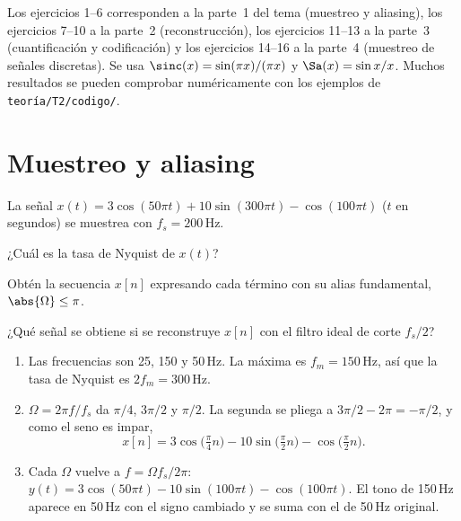 \documentclass[11pt,a4paper]{scrartcl}
\begin{document}
\ifsoluciones{}\else{}\fi

Los ejercicios 1–6 corresponden a la parte~1 del tema (muestreo y aliasing), los ejercicios 7–10 a la parte~2 (reconstrucción), los ejercicios 11–13 a la parte~3 (cuantificación y codificación) y los ejercicios 14–16 a la parte~4 (muestreo de señales discretas). Se usa $\sinc(x)=\sin(\pi x)/(\pi x)$ y $\Sa(x)=\sin x/x$. Muchos resultados se pueden comprobar numéricamente con los ejemplos de \texttt{teoría/T2/codigo/}.

\section*{Muestreo y aliasing}

\begin{ejercicio}
  La señal $x(t)=3\cos(50\pi t)+10\sin(300\pi t)-\cos(100\pi t)$ ($t$ en segundos) se muestrea con $f_s=200$\,Hz.
  \begin{incisos}[1]
    \item ¿Cuál es la tasa de Nyquist de $x(t)$?
    \item Obtén la secuencia $x[n]$ expresando cada término con su alias fundamental, $\abs{\Omega}\le\pi$.
    \item ¿Qué señal se obtiene si se reconstruye $x[n]$ con el filtro ideal de corte $f_s/2$?
  \end{incisos}
\end{ejercicio}
\begin{solucion}
  \begin{enumerate}[label=\alph*)]
    \item Las frecuencias son 25, 150 y 50\,Hz. La máxima es $f_m=150$\,Hz, así que la tasa de Nyquist es $2f_m=300$\,Hz.
    \item $\Omega=2\pi f/f_s$ da $\pi/4$, $3\pi/2$ y $\pi/2$. La segunda se pliega a $3\pi/2-2\pi=-\pi/2$, y como el seno es impar,
    \[
      x[n]=3\cos\big(\tfrac\pi4n\big)-10\sin\big(\tfrac\pi2n\big)-\cos\big(\tfrac\pi2n\big).
    \]
    \item Cada $\Omega$ vuelve a $f=\Omega f_s/2\pi$: $y(t)=3\cos(50\pi t)-10\sin(100\pi t)-\cos(100\pi t)$. El tono de 150\,Hz aparece en 50\,Hz con el signo cambiado y se suma con el de 50\,Hz original.
  \end{enumerate}
\end{solucion}
\end{document}
